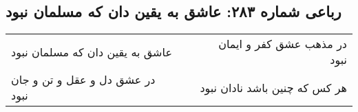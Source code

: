 \begin{center}
\section*{رباعی شماره ۲۸۳: عاشق به یقین دان که مسلمان نبود}
\label{sec:sh283}
\begin{longtable}{l p{0.5cm} r}
عاشق به یقین دان که مسلمان نبود
&&
در مذهب عشق کفر و ایمان نبود
\\
در عشق دل و عقل و تن و جان نبود
&&
هر کس که چنین باشد نادان نبود
\\
\end{longtable}
\end{center}
